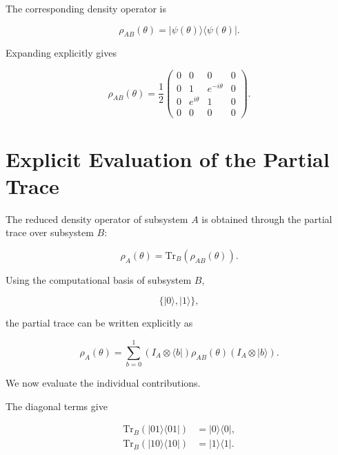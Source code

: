The corresponding density operator is

\begin{equation}
\rho_{AB}(\theta)
=
|\psi(\theta)\rangle
\langle\psi(\theta)|.
\label{eq:appendix_phase_density_operator}
\end{equation}

Expanding explicitly gives

\begin{equation}
\rho_{AB}(\theta)
=
\frac{1}{2}
\begin{pmatrix}
0 & 0 & 0 & 0 \\
0 & 1 & e^{-i\theta} & 0 \\
0 & e^{i\theta} & 1 & 0 \\
0 & 0 & 0 & 0
\end{pmatrix}.
\label{eq:appendix_phase_density_matrix}
\end{equation}


\section{Explicit Evaluation of the Partial Trace}

The reduced density operator of subsystem \( A \) is obtained through the partial trace over subsystem \( B \):

\begin{equation}
\rho_A(\theta)
=
\mathrm{Tr}_B
\left(
\rho_{AB}(\theta)
\right).
\label{eq:appendix_partial_trace_definition}
\end{equation}

Using the computational basis of subsystem \( B \),

\[
\{
|0\rangle,
|1\rangle
\},
\]

the partial trace can be written explicitly as

\begin{equation}
\rho_A(\theta)
=
\sum_{b=0}^{1}
\left(
I_A \otimes \langle b|
\right)
\rho_{AB}(\theta)
\left(
I_A \otimes |b\rangle
\right).
\label{eq:appendix_partial_trace_explicit}
\end{equation}

We now evaluate the individual contributions.

\medskip

The diagonal terms give

\begin{align}
\mathrm{Tr}_B
\left(
|01\rangle\langle 01|
\right)
&=
|0\rangle\langle 0|,
\nonumber
\\
\mathrm{Tr}_B
\left(
|10\rangle\langle 10|
\right)
&=
|1\rangle\langle 1|.
\label{eq:appendix_partial_trace_diagonal}
\end{align}

